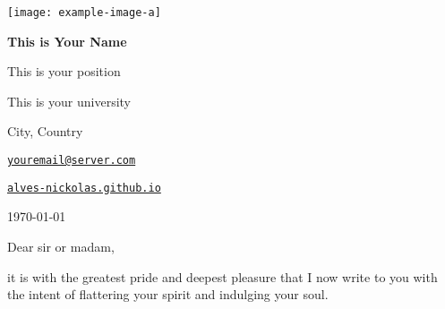 \documentclass[a4paper, 11pt]{article}
\begin{document}
\pagestyle{nicestyle} %

\vspace{-1cm} %

\begin{center}
    \noindent\huge\texttt{[image: example-image-a]} %
\end{center}

\noindent
\begin{minipage}{0.5\textwidth}
    \Large {\bfseries\sffamily This is Your Name} \par %
    \normalsize This is your position\par %
    This is your university\par %
    City, Country %
\end{minipage}
\hfill
\begin{minipage}{0.35\textwidth}\flushright
    \href{mailto:youremail@server.com}{\makebox[1.5em]{\faEnvelope[regular]} \texttt{youremail@server.com}}\par %
    \href{https://alves-nickolas.github.io}{\makebox[1.5em]{\faGlobe} \texttt{alves-nickolas.github.io}} %
\end{minipage}\vspace{1cm} %

\noindent\today %
\vfill %


\noindent
Dear sir or madam,

it is with the greatest pride and deepest pleasure that I now write to you with the intent of flattering your spirit and indulging your soul. %



\vspace{4cm} %

\vfill\vfill\null %
\end{document}
